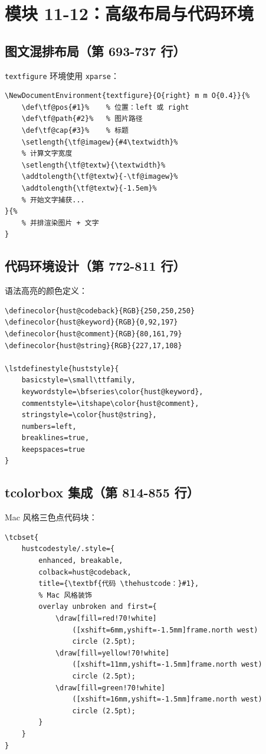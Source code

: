 \documentclass[linux]{hustreport}
\begin{document}
\section{模块 11-12：高级布局与代码环境}

\subsection{图文混排布局（第 693-737 行）}

\texttt{textfigure} 环境使用 \texttt{xparse}：

\begin{verbatim}
\NewDocumentEnvironment{textfigure}{O{right} m m O{0.4}}{%
    \def\tf@pos{#1}%    % 位置：left 或 right
    \def\tf@path{#2}%   % 图片路径
    \def\tf@cap{#3}%    % 标题
    \setlength{\tf@imagew}{#4\textwidth}%
    % 计算文字宽度
    \setlength{\tf@textw}{\textwidth}%
    \addtolength{\tf@textw}{-\tf@imagew}%
    \addtolength{\tf@textw}{-1.5em}%
    % 开始文字捕获...
}{%
    % 并排渲染图片 + 文字
}
\end{verbatim}

\subsection{代码环境设计（第 772-811 行）}

语法高亮的颜色定义：

\begin{verbatim}
\definecolor{hust@codeback}{RGB}{250,250,250}
\definecolor{hust@keyword}{RGB}{0,92,197}
\definecolor{hust@comment}{RGB}{80,161,79}
\definecolor{hust@string}{RGB}{227,17,108}

\lstdefinestyle{huststyle}{
    basicstyle=\small\ttfamily,
    keywordstyle=\bfseries\color{hust@keyword},
    commentstyle=\itshape\color{hust@comment},
    stringstyle=\color{hust@string},
    numbers=left,
    breaklines=true,
    keepspaces=true
}
\end{verbatim}

\subsection{tcolorbox 集成（第 814-855 行）}

Mac 风格三色点代码块：

\begin{verbatim}
\tcbset{
    hustcodestyle/.style={
        enhanced, breakable,
        colback=hust@codeback,
        title={\textbf{代码 \thehustcode：}#1},
        % Mac 风格装饰
        overlay unbroken and first={
            \draw[fill=red!70!white] 
                ([xshift=6mm,yshift=-1.5mm]frame.north west) 
                circle (2.5pt);
            \draw[fill=yellow!70!white] 
                ([xshift=11mm,yshift=-1.5mm]frame.north west) 
                circle (2.5pt);
            \draw[fill=green!70!white] 
                ([xshift=16mm,yshift=-1.5mm]frame.north west) 
                circle (2.5pt);
        }
    }
}
\end{verbatim}
\end{document}
